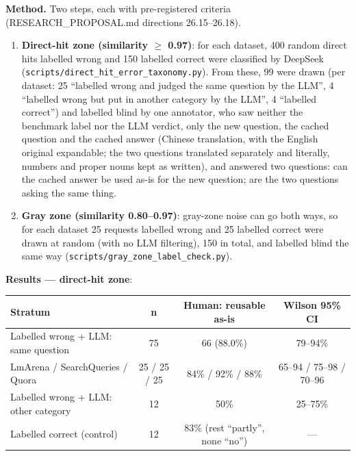 \documentclass[11pt]{article}
\newenvironment{fittab}{\begin{lrbox}{\fittabbox}}{\end{lrbox}%
  \ifdim\wd\fittabbox>\linewidth\resizebox{\linewidth}{!}{\usebox{\fittabbox}}\else\usebox{\fittabbox}\fi}
\begin{document}
\textbf{Method.} Two steps, each with pre-registered criteria (RESEARCH\_PROPOSAL.md directions 26.15–26.18).
\begin{enumerate}[leftmargin=*]
  \item \textbf{Direct-hit zone (similarity $\geq$ 0.97)}: for each dataset, 400 random direct hits labelled wrong and 150 labelled correct were classified by DeepSeek (\texttt{scripts/\allowbreak{}direct\_\allowbreak{}hit\_\allowbreak{}error\_\allowbreak{}taxonomy.\allowbreak{}py}). From these, 99 were drawn (per dataset: 25 ``labelled wrong and judged the same question by the LLM'', 4 ``labelled wrong but put in another category by the LLM'', 4 ``labelled correct'') and labelled blind by one annotator, who saw neither the benchmark label nor the LLM verdict, only the new question, the cached question and the cached answer (Chinese translation, with the English original expandable; the two questions translated separately and literally, numbers and proper nouns kept as written), and answered two questions: can the cached answer be used as-is for the new question; are the two questions asking the same thing.
  \item \textbf{Gray zone (similarity 0.80–0.97)}: gray-zone noise can go both ways, so for each dataset 25 requests labelled wrong and 25 labelled correct were drawn at random (with no LLM filtering), 150 in total, and labelled blind the same way (\texttt{scripts/\allowbreak{}gray\_\allowbreak{}zone\_\allowbreak{}label\_\allowbreak{}check.\allowbreak{}py}).
\end{enumerate}

\textbf{Results — direct-hit zone}:

\begin{center}
\small
\begin{fittab}\begin{tabular}{@{}lccc@{}}
\toprule
\textbf{Stratum} & \textbf{n} & \textbf{Human: reusable as-is} & \textbf{Wilson 95\% CI} \\
\midrule
Labelled wrong + LLM: same question & 75 & 66 (88.0\%) & 79--94\% \\
\quad LmArena / SearchQueries / Quora & 25 / 25 / 25 & 84\% / 92\% / 88\% & 65--94 / 75--98 / 70--96 \\
Labelled wrong + LLM: other category & 12 & 50\% & 25--75\% \\
Labelled correct (control) & 12 & 83\% (rest ``partly'', none ``no'') & --- \\
\bottomrule
\end{tabular}\end{fittab}
\end{center}
\end{document}
